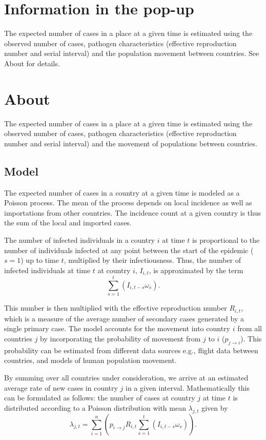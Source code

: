 \documentclass[a4paper,12pt]{article}
\begin{document}
\section{Information in the pop-up}
The expected number of cases in a place at a given time is estimated
using the observed number of cases, pathogen characteristics (effective reproduction number
and serial interval) and the population movement between
countries. See About for details.

\section{About}

The expected number of cases in a place at a given time is estimated
using the observed number of cases, pathogen characteristics (effective reproduction number
and serial interval) and the movement of populations between
countries.
\subsection*{Model}
The expected number of cases in a country at a given time is modeled as
a Poisson process. The mean of the process depends on local incidence
as well as importations from other countries. The incidence count at a
given country is thus the sum of the local and imported cases.

The number of infected individuals in a country $i$ at time $t$ is proportional
to the number of individuals infected at any point between the start
of the epidemic ($s = 1$) up to time $t$, multiplied by their
infectiousness. Thus, the number of infected individuals at time $t$
at country $i$, $I_{i, t}$, is approximated by the term
\[
  \sum_{s = 1}^{t}{\left( I_{i, t-s} \omega_s\right)}.
  \]

This number is then multiplied with the effective
reproduction number $R_{i, t}$, which is a measure of the
average number of secondary cases generated by a single primary
case.
The model accounts for the movement into country $i$
from all countries $j$ by incorporating the probability of movement
from $j$ to $i$ ($p_{j \rightarrow i}$). This probability can be
estimated from different data sources e.g., flight data between
countries, and models of human population movement.

By summing over all countries under consideration,  we arrive at an
estimated average rate of new cases in country $j$ in a given interval. Mathematically
this can be formulated as follows: the number of cases at country $j$ at time $t$ is
distributed according to a Poisson distribution with mean $\lambda_{j,
  t}$ given by
\[
  \lambda_{j, t} = \sum_{i = 1}^{n}{\left( p_{i \rightarrow j}R_{i,
        t}\sum_{s = 1}^{t}{\left( I_{i, t-s} \omega_s\right)}
    \right)}.
\]
\end{document}
